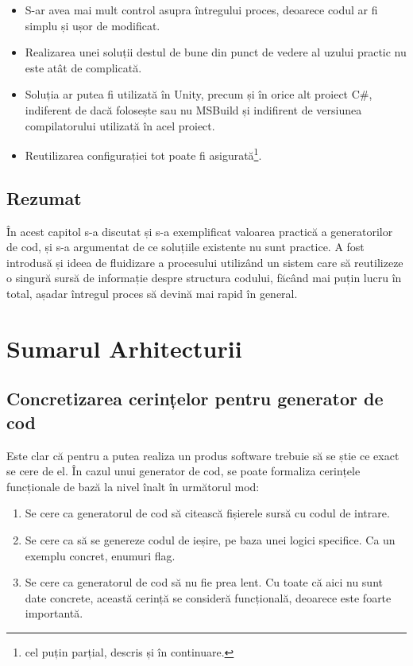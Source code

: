 \documentclass[a4paper,12pt]{report}
\begin{document}
\begin{itemize}
  \item S-ar avea mai mult control asupra întregului proces, deoarece codul ar fi simplu și ușor de modificat.

  \item Realizarea unei soluții destul de bune din punct de vedere al uzului practic nu este atât de complicată.
  
  \item Soluția ar putea fi utilizată în Unity, precum și în orice alt proiect C\#, indiferent de dacă folosește sau nu MSBuild și indifirent de versiunea compilatorului utilizată în acel proiect.
  
  \item Reutilizarea configurației tot poate fi asigurată\footnote{cel puțin parțial, descris și în continuare.}.
\end{itemize}

\section{Rezumat}

În acest capitol s-a discutat și s-a exemplificat valoarea practică a generatorilor de cod, și s-a argumentat de ce soluțiile existente nu sunt practice.
A fost introdusă și ideea de fluidizare a procesului utilizând un sistem care să reutilizeze o singură sursă de informație despre structura codului, făcând mai puțin lucru în total, așadar întregul proces să devină mai rapid în general.

\chapter{Sumarul Arhitecturii}

\section{Concretizarea cerințelor pentru generator de cod}

Este clar că pentru a putea realiza un produs software trebuie să se știe ce exact se cere de el.
În cazul unui generator de cod, se poate formaliza cerințele funcționale de bază la nivel înalt în următorul mod:

\begin{enumerate}
  \item Se cere ca generatorul de cod să citească fișierele sursă cu codul de intrare.
  \item Se cere ca să se genereze codul de ieșire, pe baza unei logici specifice. Ca un exemplu concret, enumuri flag.
  \item Se cere ca generatorul de cod să nu fie prea lent.
        Cu toate că aici nu sunt date concrete, această cerință se consideră funcțională, deoarece este foarte importantă.
\end{enumerate}
\end{document}
